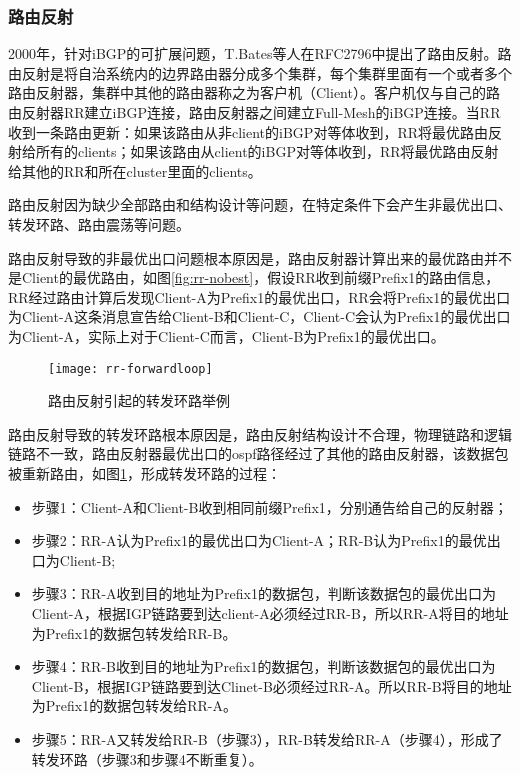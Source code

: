 \subsubsection{路由反射\cite{rfc2796}}
2000年，针对iBGP的可扩展问题，T.Bates等人在RFC2796\cite{rfc2796}中提出了路由反射。路由反射是将自治系统内的边界路由器分成多个集群，每个集群里面有一个或者多个路由反射器，集群中其他的路由器称之为客户机（Client）。客户机仅与自己的路由反射器RR建立iBGP连接，路由反射器之间建立Full-Mesh的iBGP连接。当RR收到一条路由更新：如果该路由从非client的iBGP对等体收到，RR将最优路由反射给所有的clients；如果该路由从client的iBGP对等体收到，RR将最优路由反射给其他的RR和所在cluster里面的clients。

路由反射因为缺少全部路由和结构设计等问题，在特定条件下会产生非最优出口、转发环路、路由震荡等问题。

路由反射导致的非最优出口问题根本原因是，路由反射器计算出来的最优路由并不是Client的最优路由，如图\ref{fig:rr-nobest}，假设RR收到前缀Prefix1的路由信息，RR经过路由计算后发现Client-A为Prefix1的最优出口，RR会将Prefix1的最优出口为Client-A这条消息宣告给Client-B和Client-C，Client-C会认为Prefix1的最优出口为Client-A，实际上对于Client-C而言，Client-B为Prefix1的最优出口。

\begin{figure}
  \centering
  \texttt{[image: rr-forwardloop]}
  \caption{路由反射引起的转发环路举例\cite{ibgp2016infocom}}
  \label{fig:rr-forwardloop}
\end{figure}

路由反射导致的转发环路根本原因是，路由反射结构设计不合理，物理链路和逻辑链路不一致，路由反射器最优出口的ospf路径经过了其他的路由反射器，该数据包被重新路由，如图\ref{fig:rr-forwardloop}，形成转发环路的过程：

\begin{itemize}
\item 步骤1：Client-A和Client-B收到相同前缀Prefix1，分别通告给自己的反射器；
\item 步骤2：RR-A认为Prefix1的最优出口为Client-A；RR-B认为Prefix1的最优出口为Client-B;
\item 步骤3：RR-A收到目的地址为Prefix1的数据包，判断该数据包的最优出口为Client-A，根据IGP链路要到达client-A必须经过RR-B，所以RR-A将目的地址为Prefix1的数据包转发给RR-B。
\item 步骤4：RR-B收到目的地址为Prefix1的数据包，判断该数据包的最优出口为Client-B，根据IGP链路要到达Clinet-B必须经过RR-A。所以RR-B将目的地址为Prefix1的数据包转发给RR-A。
\item 步骤5：RR-A又转发给RR-B（步骤3），RR-B转发给RR-A（步骤4），形成了转发环路（步骤3和步骤4不断重复）。
\end{itemize}




